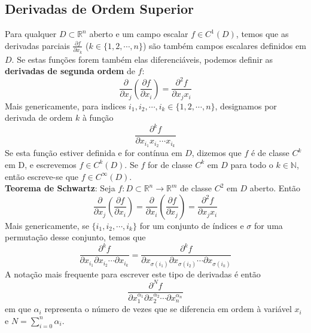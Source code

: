 \documentclass{article}
\newcommand{\R}{\mathbb{R}}
\begin{document}
\subsection{Derivadas de Ordem Superior}
Para qualquer $D \subset \R^n$ aberto e um campo escalar $f \in C^1(D)$, temos que as derivadas parciais $\frac{\partial f}{\partial x_k}$ ($k \in \{ 1, 2, \cdots, n \}$) são também campos escalares definidos em $D$. Se estas funções forem também elas diferenciáveis, podemos definir as \textbf{derivadas de segunda ordem} de $f$:
$$
\frac{\partial}{\partial x_j} \left( \frac{\partial f}{\partial x_i} \right) = \frac{\partial ^2 f}{\partial x_j x_i}
$$
Mais genericamente, para indices $i_1, i_2, \cdots , i_k \in \{ 1, 2, \cdots , n \}$, designamos por derivada de ordem $k$ à função
$$
\frac{\partial ^k f}{\partial x_{i_1}x_{i_2} \cdots x_{i_k}}
$$
Se esta função estiver definida e for contínua em $D$, dizemos que $f$ é de classe $C^k$ em D, e escrevemos $f \in C^k(D)$. Se $f$ for de classe $C^k$ em $D$ para todo o $k \in \mathbb{N}$, então escreve-se que $f \in C ^\infty (D)$.\\

\textbf{Teorema de Schwartz}: Seja $f: D \subset \R^n \to \R^m$ de classe $C^2$ em $D$ aberto. Então
$$
\frac{\partial}{\partial x_j} \left( \frac{\partial f}{\partial x_i} \right) = \frac{\partial}{\partial x_i} \left( \frac{\partial f}{\partial x_j} \right) = \frac{\partial ^2 f}{\partial x_j x_i}
$$
Mais genericamente, se $\{ i_1, i_2, \cdots , i_k \}$ for um conjunto de índices e $\sigma$ for uma permutação desse conjunto, temos que
$$
\frac{\partial ^k f}{\partial x_{i_1} \partial x_{i_2} \cdots \partial x_{i_k}} = \frac{\partial ^k f}{\partial x_{\sigma(i_1)} \partial x_{\sigma(i_2)} \cdots \partial x_{\sigma(i_k)}}
$$
A notação mais frequente para escrever este tipo de derivadas é então
$$
\frac{\partial ^N f}{\partial x_1^{\alpha_1} \partial x_2^{\alpha_2} \cdots \partial x_n ^{\alpha_n}}
$$
em que $\alpha_i$ representa o número de vezes que se diferencia em ordem à variável $x_i$ e $N = \sum_{i=0}^n \alpha_i$.
\end{document}
